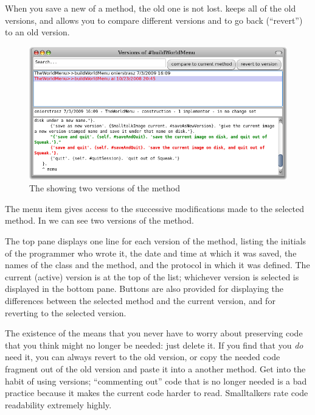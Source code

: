 \documentclass[a4paper,10pt,twoside]{book}
\begin{document}
When you save a new  of a method, the old one is not lost.  \pharo keeps all of the old versions, and allows you to compare different versions and to go back (``revert'') to an old version.
\begin{figure}[btp]
   \centering
   \includegraphics[width=\textwidth]{Versions}
   \caption{The  showing two versions of the  method}
\end{figure}
The  menu item gives access to the successive modifications made to the selected method.
In  we can see two versions of the  method.

The top pane displays one line for each version of the method, listing the initials of the programmer who wrote it, the date and time at which it was saved, the names of the class and the method, and the protocol in which it was defined.  The current (active) version is at the top of the list;  whichever version is selected is displayed in the bottom pane.
Buttons are also provided for displaying the differences between the selected method and the current version, and for reverting to the selected version.

The existence of the  means that you never have to worry about preserving code that you think might no longer be needed: just delete it.  If you find that you \emph{do} need it, you can always revert to the old version, or copy the needed code fragment out of the old version and paste it into a another method.
Get into the habit of using versions;  ``commenting out'' code that is no longer needed is a bad practice because it makes the current code harder to read.
Smalltalkers rate code readability extremely highly.
\end{document}
